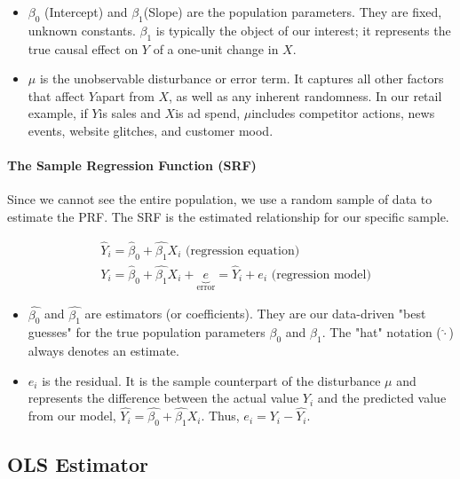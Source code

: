 \documentclass{article}
\begin{document}
\begin{itemize}
  \item $\beta_0$ (Intercept) and $\beta_1$(Slope) are the population parameters. They are fixed, unknown constants. $\beta_1$ is typically the object of our interest; it represents the true causal effect on $Y$ of a one-unit change in $X$.
  \item $\mu$ is the unobservable disturbance or error term. It captures all other factors that affect $Y$apart from $X$, as well as any inherent randomness. In our retail example, if $Y$is sales and $X$is ad spend, $\mu$includes competitor actions, news events, website glitches, and customer mood.
\end{itemize}







\paragraph{The Sample Regression Function (SRF)}

Since we cannot see the entire population, we use a random sample of data to estimate the PRF. The SRF is the estimated relationship for our specific sample.

\begin{align}
  &\hat Y_i =\hat \beta_0 +\hat{\beta_{1}}X_i \text{ (regression equation)}
  \\& Y_i=\hat \beta_0 +\hat{\beta_{1}}X_i+
  \underbrace{e}_\text{error}
  =\hat Y_i + e_i
  \text{ (regression model)}
\end{align}

\begin{itemize}
  \item $\hat{\beta_0}$ and $\hat{\beta_1}$ are estimators (or coefficients). They are our data-driven "best guesses" for the true population parameters $\beta_0$ and $\beta_1$. The "hat" notation ($\hat{\cdot}$) always denotes an estimate.
  \item $e_i$ is the residual. It is the sample counterpart of the disturbance $\mu$ and represents the difference between the actual value $Y_i$ and the predicted value from our model, $\hat{Y_i} = \hat{\beta_0} +\hat{\beta_{1}}X_i$. Thus, $e_i = Y_i - \hat{Y_i}$.
\end{itemize}



\subsection{OLS Estimator} %
\label{sub:ols_estimator}
\end{document}
